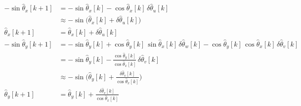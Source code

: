 \documentclass[11pt,a4paper]{ctexart}
\newcommand{\dth}{\delta\hat\theta}
\begin{document}
\vspace{2.2em}
\begin{align*}
-\sin\hat\theta_x[k+1] &= -\sin\hat\theta_x[k] - \cos\hat\theta_x[k]\,\dth_u[k] \\
&\approx -\sin\big(\hat\theta_x[k] + \dth_u[k]\big) \\
\hat\theta_x[k+1] &= \hat\theta_x[k] + \dth_u[k] \\[8pt]
-\sin\hat\theta_y[k+1] &= -\sin\hat\theta_y[k] + \cos\hat\theta_y[k]\,\sin\hat\theta_x[k]\,\dth_w[k] - \cos\hat\theta_y[k]\,\cos\hat\theta_x[k]\,\dth_v[k] \\
&= -\sin\hat\theta_y[k] - \frac{\cos\hat\theta_y[k]}{\cos\hat\theta_x[k]}\,\dth_v[k] \\
&\approx -\sin\Big(\hat\theta_y[k] + \frac{\dth_v[k]}{\cos\hat\theta_x[k]}\Big) \\
\hat\theta_y[k+1] &= \hat\theta_y[k] + \frac{\dth_v[k]}{\cos\hat\theta_x[k]}
\end{align*}
\end{document}
